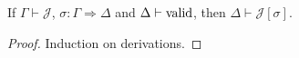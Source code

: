 \begin{code}%
\>  \AgdaSymbol{:}  \AgdaSymbol{\{}\AgdaSymbol{\}} \AgdaSymbol{\{}\AgdaSymbol{\}}            \<%
\end{code}

\begin{lemma}
If $\Gamma \vdash \mathcal{J}$, $\sigma : \Gamma \Rightarrow \Delta$ and $\Delta \vdash \mathrm{valid}$, then $\Delta \vdash \mathcal{J} [\sigma]$.
\end{lemma}

\begin{proof}
Induction on derivations.
\end{proof}

